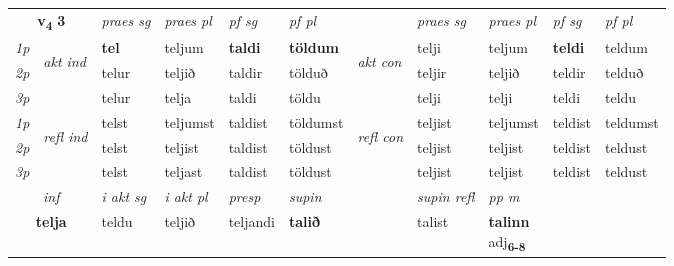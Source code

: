 \noindent
\begin{tabular}{lllllllllll} \toprule
\multicolumn{2}{c}{\textbf{v{\textsubscript{4}}} \Large{\textbf{3}}}  &  \textit{praes sg}  & \textit{praes pl}  &\textit{ pf sg} & \textit{pf pl} &  &  \textit{praes sg}  & \textit{praes pl}  & \textit{pf sg} & \textit{pf pl } \\*
	\cmidrule{3-6} \cmidrule{8-11}
 {\textit{1p}} & \multirow{3}{*}{\begin{turn}{90}\textit{akt ind}\end{turn}} & \textbf{tel} & teljum & \textbf{taldi} & \textbf{töldum} & \multirow{3}{*}{\begin{turn}{90}\textit{akt con}\end{turn}} &telji & teljum & \textbf{teldi} & teldum\\*
 {\textit{2p}} &  &  telur  & teljið & taldir & tölduð & & teljir & teljið & teldir & telduð \\*
{\textit{3p}} &  & telur & telja & taldi & töldu & & telji & telji& teldi & teldu \\*
\cmidrule{3-6} \cmidrule{8-11}
 {\textit{1p}} & \multirow{3}{*}{\begin{turn}{90}\textit{refl ind}\end{turn}}  & telst & teljumst & taldist & töldumst & \multirow{3}{*}{\begin{turn}{90}\textit{refl con}\end{turn}}  &teljist & teljumst & teldist & teldumst \\*
 {\textit{2p}} &  & telst & teljist & taldist & töldust & &teljist & teljist & teldist & teldust \\*
 {\textit{3p}}  & & telst & teljast & taldist & töldust & & teljist & teljist& teldist & teldust \\*
\cmidrule{3-6} \cmidrule{8-11}

   \multicolumn{2}{c}{\textit{inf}}  & \textit{i akt sg} & \textit{i akt pl}   & \textit{presp} & \textit{supin} && \textit{supin refl} & \textit{pp m} \\*
  \multicolumn{2}{c}{\textbf{telja}} & teldu  & teljið   & teljandi &  \textbf{talið} && talist & \specialcell{\textbf{talinn} \\ adj\textbf{\textsubscript{6-8}}} \\*
\end{tabular}

